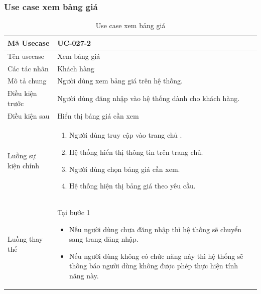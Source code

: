\documentclass[12pt,a4paper]{article}
\begin{document}

    \subsubsection*{Use case xem bảng giá}
    \begin{table}[H]
        \centering
        \begin{tabular}{|p{3.5cm}|p{11.5cm}|c|}
            \hline
            Mã Usecase      & UC-027-2                                               \\
            \hline
            Tên usecase     & Xem bảng giá                                           \\
            \hline
            Các tác nhân    & Khách hàng                                             \\
            \hline
            Mô tả chung     & Người dùng xem bảng giá trên hệ thống.                 \\
            \hline

            Điều kiện trước & Người dùng đăng nhập vào hệ thống dành cho khách hàng. \\
            \hline

            Điều kiện sau   & Hiển thị bảng giá cần xem                              \\
            \hline

            Luồng sự kiện chính & \vspace{-.8cm}\begin{enumerate}
                                                    \item Người dùng truy cập vào trang chủ .
                                                    \item Hệ thống hiển thị thông tin trên trang chủ.
                                                    \item Người dùng chọn bảng giá cần xem.
                                                    \item Hệ thống hiện thị bảng giá theo yêu cầu.
            \end{enumerate}
            \\
            \hline
            Luồng thay thế & Tại bước 1\newline
            \vspace{-.8cm}\begin{itemize}
                              \item Nếu người dùng chưa đăng nhập thì hệ thống sẽ chuyển sang trang đăng nhập.
                              \item Nếu người dùng không có chức năng này thì hệ thống sẽ thông báo người dùng không được phép thực hiện tính năng này.
            \end{itemize}

            \\ \hline
        \end{tabular}
        \caption{Use case xem bảng giá}

    \end{table}
\end{document}
